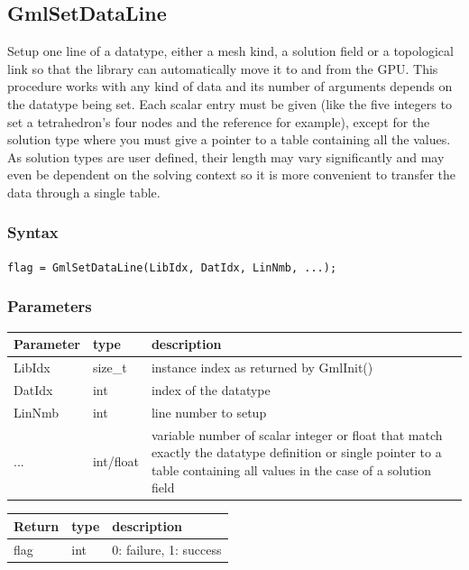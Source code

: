 \documentclass[a4paper,12pt]{article}
\begin{document}
\subsection{GmlSetDataLine}
Setup one line of a datatype, either a mesh kind, a solution field or a topological link so that the library can automatically move it to and from the GPU. This procedure works with any kind of data and its number of arguments depends on the datatype being set. Each scalar entry must be given (like the five integers to set a tetrahedron's four nodes and the reference for example), except for the solution type where you must give a pointer to a table containing all the values. As solution types are user defined, their length may vary significantly and may even be dependent on the solving context so it is more convenient to transfer the data through a single table.

\subsubsection*{Syntax}
{\tt flag = GmlSetDataLine(LibIdx, DatIdx, LinNmb, ...);}

\subsubsection*{Parameters}
\begin{tabular}{|m{2cm}|m{1.5cm}|m{10.5cm}|}
\hline
Parameter  & type      & description \\
\hline
LibIdx     & size\_t   & instance index as returned by GmlInit() \\
\hline
DatIdx     & int       & index of the datatype \\
\hline
LinNmb     & int       & line number to setup \\
\hline
...        & int/float & variable number of scalar integer or float that match exactly the datatype definition or single pointer to a table containing all values in the case of a solution field \\
\hline
\end{tabular}

\medskip

\begin{tabular}{|m{2cm}|m{1.5cm}|m{10.5cm}|}
\hline
Return     & type   & description \\
\hline
flag       & int    & 0: failure, 1: success \\
\hline
\end{tabular}
\end{document}
